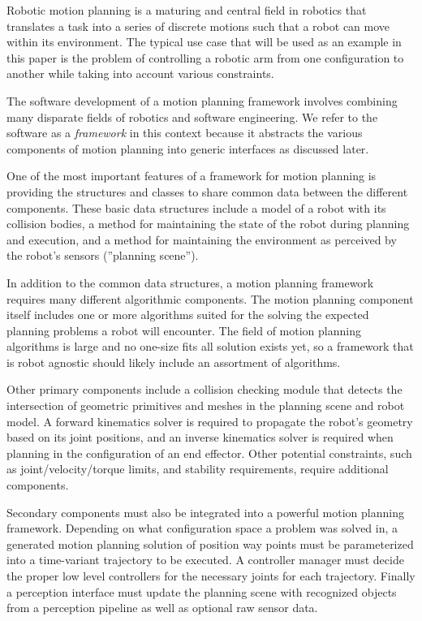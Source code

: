 \documentclass[10pt,journal,compsoc]{joser1}
\begin{document}
{Robotic motion planning is a maturing and central field in robotics \cite{moll2011teaching} that translates a task into a series of discrete motions such that a robot can move within its environment. The typical use case that will be used as an example in this paper is the problem of controlling a robotic arm from one configuration to another while taking into account various constraints.

The software development of a motion planning framework involves combining many disparate fields of robotics and software engineering. We refer to the software as a \textit{framework} in this context because it abstracts the various components of motion planning into generic interfaces as discussed later.

One of the most important features of a framework for motion planning is providing the structures and classes to share common data between the different components. These basic data structures include a model of a robot with its collision bodies, a method for maintaining the state of the robot during planning and execution, and a method for maintaining the environment as perceived by the robot's sensors (''planning scene'').

In addition to the common data structures, a motion planning framework requires many different algorithmic components. The motion planning component itself includes one or more algorithms suited for the solving the expected planning problems a robot will encounter. The field of motion planning algorithms is large and no one-size fits all solution exists yet, so a framework that is robot agnostic should likely include an assortment of algorithms.

Other primary components include a collision checking module that detects the intersection of geometric primitives and meshes in the planning scene and robot model. A forward kinematics solver is required to propagate the robot's geometry based on its joint positions, and an inverse kinematics solver is required when planning in the configuration of an end effector. Other potential constraints, such as joint/velocity/torque limits, and stability requirements, require additional components.

Secondary components must also be integrated into a powerful motion planning framework. Depending on what configuration space a problem was solved in, a generated motion planning solution of position way points must be parameterized into a time-variant trajectory to be executed. A controller manager must decide the proper low level controllers for the necessary joints for each trajectory. Finally a perception interface must update the planning scene with recognized objects from a perception pipeline as well as optional raw sensor data.

}
\end{document}
